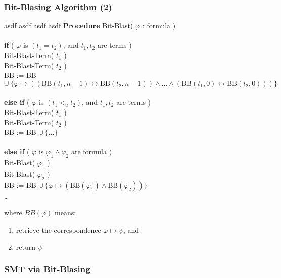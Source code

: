 \begin{frame}[fragile]
  \frametitle{Bit-Blasing Algorithm (2)}

  \scriptsize

  \begin{tabbing}
    \= asdf \= asdf \= asdf \= asdf \kill
    \> {\bf Procedure} Bit-Blast( $\varphi$ :  formula ) \\
    \> \\
    \> {\bf if} ( $\varphi$ is $(t_1 = t_2)$, and $t_1, t_2$ are  terms ) \\
    \> \> Bit-Blast-Term( $t_1$ ) \\
    \> \> Bit-Blast-Term( $t_2$ ) \\
    \> \> BB := BB $\cup\ \{ \varphi \mapsto ((\mbox{BB}(t_1, n-1) \leftrightarrow \mbox{BB}(t_2, n-1)) \wedge 
	                                      \ldots \wedge
				              (\mbox{BB}(t_1, 0) \leftrightarrow \mbox{BB}(t_2, 0))) \} $ \\
    \> \\ \pause
    \> {\bf else if} ( $\varphi$ is $(t_1 <_u t_2)$, and $t_1, t_2$ are  terms ) \\
    \> \> Bit-Blast-Term( $t_1$ ) \\
    \> \> Bit-Blast-Term( $t_2$ ) \\
    \> \> BB := BB $\cup\ \{ \ldots \}$ \\
    \> \\ \pause
    \> {\bf else if} ( $\varphi$ is $\varphi_1 \wedge \varphi_2$ are  formula ) \\
    \> \> Bit-Blast( $\varphi_1$ ) \\
    \> \> Bit-Blast( $\varphi_2$ ) \\
    \> \> BB := BB $\cup\ \{ \varphi \mapsto (\mbox{BB}(\varphi_1) \wedge \mbox{BB}(\varphi_2)) \}$ \\
    \ldots
  \end{tabbing}

  where $BB(\varphi)$ means: 
  \begin{enumerate}
    \item retrieve the correspondence $\varphi \mapsto \psi$, and
    \item return $\psi$ 
  \end{enumerate}

\end{frame}

\begin{frame}
  \frametitle{SMT via Bit-Blasing}

  \begin{center}
  \scalebox{.5}{}
  \end{center}

\end{frame}

